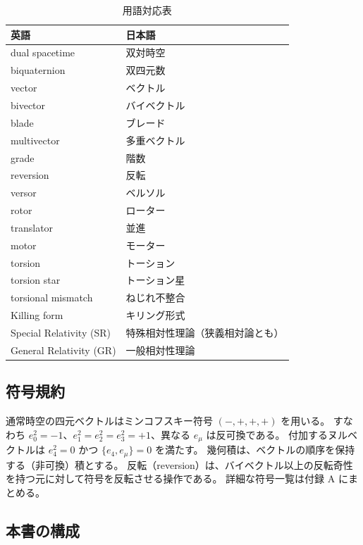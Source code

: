 \documentclass[dvipdfmx,a4paper,oneside]{jsbook}
\numberwithin{equation}{chapter}
\begin{document}
\begin{table}[htbp]
  \centering
  \caption{用語対応表}
  \label{tab:terminology}
  \begin{tabular}{@{}ll@{}}
    \toprule
    英語 & 日本語 \\
    \midrule
    dual spacetime & 双対時空 \\
    biquaternion & 双四元数 \\
    vector & ベクトル \\
    bivector & バイベクトル \\
    blade & ブレード \\
    multivector & 多重ベクトル \\
    grade & 階数 \\
    reversion & 反転 \\
    versor & ベルソル \\
    rotor & ローター \\
    translator & 並進 \\
    motor & モーター \\
    torsion & トーション \\
    torsion star & トーション星 \\
    torsional mismatch & ねじれ不整合 \\
    Killing form & キリング形式 \\
    Special Relativity (SR) & 特殊相対性理論（狭義相対論とも） \\
    General Relativity (GR) & 一般相対性理論 \\
    \bottomrule
  \end{tabular}
\end{table}

\subsection*{符号規約}

通常時空の四元ベクトルはミンコフスキー符号 \((-,+,+,+)\) を用いる。
すなわち \(e_0^2 = -1\)、\(e_1^2 = e_2^2 = e_3^2 = +1\)、異なる \(e_\mu\) は反可換である。
付加するヌルベクトルは \(e_4^2 = 0\) かつ \(\{e_4, e_\mu\} = 0\) を満たす。
幾何積は、ベクトルの順序を保持する（非可換）積とする。
反転（reversion）は、バイベクトル以上の反転奇性を持つ元に対して符号を反転させる操作である。
詳細な符号一覧は付録 A にまとめる。

\subsection*{本書の構成}
\end{document}
